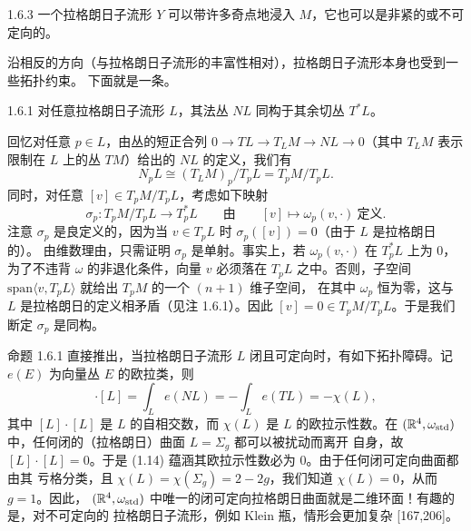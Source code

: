 \begin{wrem}{1.6.3}
一个拉格朗日子流形 $Y$ 可以带许多奇点地浸入 $M$，它也可以是非紧的或不可定向的。
\end{wrem}

沿相反的方向（与拉格朗日子流形的丰富性相对），拉格朗日子流形本身也受到一些拓扑约束。
下面就是一条。

\begin{wprop}{1.6.1}
对任意拉格朗日子流形 $L$，其法丛 $NL$ 同构于其余切丛 $T^*L$。
\end{wprop}

\begin{wproof}
回忆对任意 $p\in L$，由丛的短正合列 $0\to TL\to T_LM\to NL\to0$（其中 $T_LM$ 表示限制在
$L$ 上的丛 $TM$）给出的 $NL$ 的定义，我们有
\[
  N_pL\cong(T_LM)_p/T_pL=T_pM/T_pL .
\]
同时，对任意 $[v]\in T_pM/T_pL$，考虑如下映射
\[
  \sigma_p:T_pM/T_pL\longrightarrow T_p^*L
  \qquad\text{由}\qquad [v]\mapsto\omega_p(v,\cdot)\ \text{定义}.
\]
注意 $\sigma_p$ 是良定义的，因为当 $v\in T_pL$ 时 $\sigma_p([v])=0$（由于 $L$ 是拉格朗日的）。
由维数理由，只需证明 $\sigma_p$ 是单射。事实上，若 $\omega_p(v,\cdot)$ 在 $T_p^*L$ 上为 $0$，
为了不违背 $\omega$ 的非退化条件，向量 $v$ 必须落在 $T_pL$ 之中。否则，子空间
$\mathrm{span}\langle v,T_pL\rangle$ 就给出 $T_pM$ 的一个 $(n+1)$ 维子空间，
在其中 $\omega_p$ 恒为零，这与 $L$ 是拉格朗日的定义相矛盾（见注 1.6.1）。因此
$[v]=0\in T_pM/T_pL$。于是我们断定 $\sigma_p$ 是同构。
\end{wproof}

命题 1.6.1 直接推出，当拉格朗日子流形 $L$ 闭且可定向时，有如下拓扑障碍。记 $e(E)$ 为向量丛
$E$ 的欧拉类，则
\begin{equation}
  [L]\cdot[L]=\int_L e(NL)=-\int_L e(TL)=-\chi(L),
  \tag{1.14}
\end{equation}
其中 $[L]\cdot[L]$ 是 $L$ 的自相交数，而 $\chi(L)$ 是 $L$ 的欧拉示性数。在
$(\mathbb{R}^4,\omega_{\mathrm{std}})$ 中，任何闭的（拉格朗日）曲面 $L=\Sigma_g$ 都可以被扰动而离开
自身，故 $[L]\cdot[L]=0$。于是 (1.14) 蕴涵其欧拉示性数必为 $0$。由于任何闭可定向曲面都由其
亏格分类，且 $\chi(L)=\chi(\Sigma_g)=2-2g$，我们知道 $\chi(L)=0$，从而 $g=1$。因此，
$(\mathbb{R}^4,\omega_{\mathrm{std}})$ 中唯一的闭可定向拉格朗日曲面就是二维环面！有趣的是，对不可定向的
拉格朗日子流形，例如 Klein 瓶，情形会更加复杂 [167,206]。

